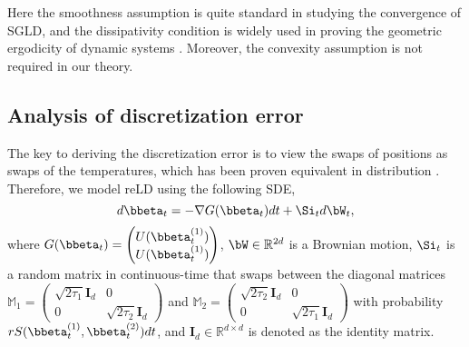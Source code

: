Here the smoothness assumption is quite standard in studying the convergence of SGLD, and the dissipativity condition is widely used in proving the geometric ergodicity of dynamic systems \citep{Maxim17, Xu18}. Moreover, the convexity assumption is not required in our theory.



\subsection{Analysis of discretization error}

The key to deriving the discretization error is to view the swaps of positions as swaps of the temperatures, which has been proven equivalent in distribution \citep{Paul12}. Therefore, we model reLD using the following SDE, 
\begin{equation}\label{replica exchange}
    d\bbeta_t=-\nabla G(\bbeta_t)dt+\Si_td\bW_t,
\end{equation}{}
where  $G(\bbeta_t)=\begin{pmatrix}{}
U(\bbeta_t^{(1)})\\
U(\bbeta_t^{(1)})
\end{pmatrix}$, $\bW\in\mathbb{R}^{2d}$ is a Brownian motion, $\Si_t$ is a random matrix in continuous-time that swaps between the diagonal matrices $\mathbb{M}_1=\begin{pmatrix}{}
\sqrt{2\tau_1}\mathbf I_d&0\\
0&\sqrt{2\tau_2}\mathbf I_d
\end{pmatrix}$ and $\mathbb{M}_2=\begin{pmatrix}{}
\sqrt{2\tau_2}\mathbf I_d&0\\
0&\sqrt{2\tau_1}\mathbf I_d
\end{pmatrix}$ with probability $r S(\bbeta_t^{(1)}, \bbeta_t^{(2)})dt$, and $\mathbf I_d\in \mathbb R^{d\times d}$ is denoted as the identity matrix.

